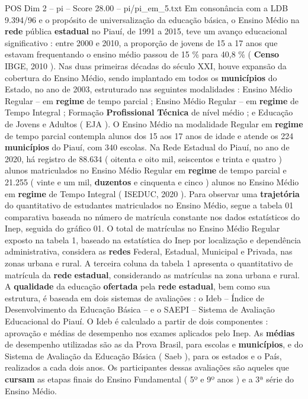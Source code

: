 \begin{textsample}{POS Dim 2 – pi – Score 28.00 – pi/pi\_em\_5.txt}
Em consonância com a LDB 9.394/96 e o propósito de universalização da educação básica, o Ensino Médio na \textbf{rede} pública \textbf{estadual} no Piauí, de 1991 a 2015, teve um avanço educacional significativo : entre 2000 e 2010, a proporção de jovens de 15 a 17 anos que estavam frequentando o ensino médio passou de 15 \% para 40,8 \% ( \textbf{Censo} IBGE, 2010 ).
Nas duas primeiras décadas do século XXI, houve expansão da cobertura do Ensino Médio, sendo implantado em todos os \textbf{municípios} do Estado, no ano de 2003, estruturado nas seguintes modalidades : Ensino Médio Regular – em \textbf{regime} de tempo parcial ; Ensino Médio Regular – em \textbf{regime} de Tempo Integral ; Formação \textbf{Profissional} \textbf{Técnica} de nível médio ; e Educação de Jovens e Adultos ( EJA ).
O Ensino Médio na modalidade Regular em \textbf{regime} de tempo parcial contempla alunos dos 15 aos 17 anos de idade e atende os 224 \textbf{municípios} do Piauí, com 340 escolas.
Na Rede Estadual do Piauí, no ano de 2020, há registro de 88.634 ( oitenta e oito mil, seiscentos e trinta e quatro ) alunos matriculados no Ensino Médio Regular em \textbf{regime} de tempo parcial e 21.255 ( vinte e um mil, \textbf{duzentos} e cinquenta e cinco ) alunos no Ensino Médio em \textbf{regime} de Tempo Integral ( ISEDUC, 2020 ).
Para observar uma \textbf{trajetória} do quantitativo de estudantes matriculados no Ensino Médio, segue a tabela 01 comparativa baseada no número de matrícula constante nos dados estatísticos do Inep, seguida do gráfico 01.
O total de matrículas no Ensino Médio Regular exposto na tabela 1, baseado na estatística do Inep por localização e dependência administrativa, considera as \textbf{redes} Federal, Estadual, Municipal e Privada, nas zonas urbana e rural.
A terceira coluna da tabela 1 apresenta o quantitativo de matrícula da \textbf{rede} \textbf{estadual}, considerando as matrículas na zona urbana e rural.
A \textbf{qualidade} da educação \textbf{ofertada} pela \textbf{rede} \textbf{estadual}, bem como sua estrutura, é baseada em dois sistemas de avaliações : o Ideb – Índice de Desenvolvimento da Educação Básica – e o SAEPI – Sistema de Avaliação Educacional do Piauí.
O Ideb é calculado a partir de dois componentes : aprovação e médias de desempenho nos exames aplicados pelo Inep.
As \textbf{médias} de desempenho utilizadas são as da Prova Brasil, para escolas e \textbf{municípios}, e do Sistema de Avaliação da Educação Básica ( Saeb ), para os estados e o País, realizados a cada dois anos.
Os participantes dessas avaliações são aqueles que \textbf{cursam} as etapas finais do Ensino Fundamental ( 5º e 9º anos ) e a 3ª série do Ensino Médio.

\end{textsample}
